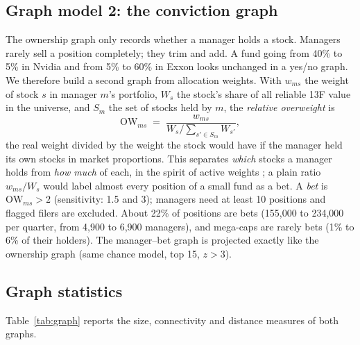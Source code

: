 \documentclass[10pt,a4paper]{article}
\begin{document}
\subsection{Graph model 2: the conviction graph}
The ownership graph only records whether a manager holds a stock. Managers rarely sell a position completely; they trim and add. A fund going from 40\% to 5\% in Nvidia and from 5\% to 60\% in Exxon looks unchanged in a yes/no graph. We therefore build a second graph from allocation weights. With $w_{ms}$ the weight of stock $s$ in manager $m$'s portfolio, $W_s$ the stock's share of all reliable 13F value in the universe, and $S_m$ the set of stocks held by $m$, the \emph{relative overweight} is
\begin{equation}
  \mathrm{OW}_{ms} \;=\; \frac{w_{ms}}{W_s \big/ \sum_{s' \in S_m} W_{s'}} ,
\end{equation}
the real weight divided by the weight the stock would have if the manager held its own stocks in market proportions. This separates \emph{which} stocks a manager holds from \emph{how much} of each, in the spirit of active weights \cite{cremers2009}; a plain ratio $w_{ms}/W_s$ would label almost every position of a small fund as a bet. A \emph{bet} is $\mathrm{OW}_{ms}>2$ (sensitivity: 1.5 and 3); managers need at least 10 positions and flagged filers are excluded. About 22\% of positions are bets (155,000 to 234,000 per quarter, from 4,900 to 6,900 managers), and mega-caps are rarely bets (1\% to 6\% of their holders). The manager--bet graph is projected exactly like the ownership graph (same chance model, top 15, $z>3$).

\subsection{Graph statistics}
Table~\ref{tab:graph} reports the size, connectivity and distance measures of both graphs.
\end{document}

